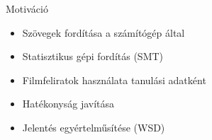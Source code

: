 \begin{frame}{Motiváció}
\begin{itemize}
  \item {Szövegek fordítása a számítógép által}
  \item {Statisztikus gépi fordítás (SMT)}
  \item {Filmfeliratok használata tanulási adatként}
  \item {Hatékonyság javítása}
  \item {Jelentés egyértelműsítése (WSD)}
  
\end{itemize}

\end{frame}